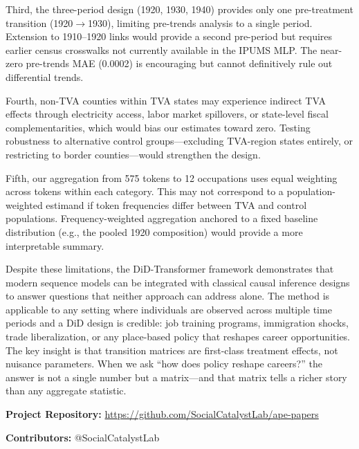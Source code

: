 \documentclass[12pt]{article}
\begin{document}
Third, the three-period design (1920, 1930, 1940) provides only one pre-treatment transition (1920$\to$1930), limiting pre-trends analysis to a single period. Extension to 1910--1920 links would provide a second pre-period but requires earlier census crosswalks not currently available in the IPUMS MLP. The near-zero pre-trends MAE (0.0002) is encouraging but cannot definitively rule out differential trends.

Fourth, non-TVA counties within TVA states may experience indirect TVA effects through electricity access, labor market spillovers, or state-level fiscal complementarities, which would bias our estimates toward zero. Testing robustness to alternative control groups---excluding TVA-region states entirely, or restricting to border counties---would strengthen the design.

Fifth, our aggregation from 575 tokens to 12 occupations uses equal weighting across tokens within each category. This may not correspond to a population-weighted estimand if token frequencies differ between TVA and control populations. Frequency-weighted aggregation anchored to a fixed baseline distribution (e.g., the pooled 1920 composition) would provide a more interpretable summary.

Despite these limitations, the DiD-Transformer framework demonstrates that modern sequence models can be integrated with classical causal inference designs to answer questions that neither approach can address alone. The method is applicable to any setting where individuals are observed across multiple time periods and a DiD design is credible: job training programs, immigration shocks, trade liberalization, or any place-based policy that reshapes career opportunities. The key insight is that transition matrices are first-class treatment effects, not nuisance parameters. When we ask ``how does policy reshape careers?'' the answer is not a single number but a matrix---and that matrix tells a richer story than any aggregate statistic.


\newpage

\noindent\textbf{Project Repository:} \url{https://github.com/SocialCatalystLab/ape-papers}

\noindent\textbf{Contributors:} @SocialCatalystLab

\label{apep_main_text_end}


\end{document}
